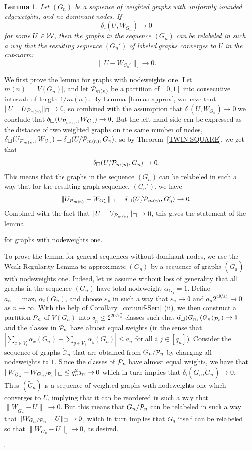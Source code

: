 \documentclass[12pt]{article}
\newtheorem{lemma}[theorem]{Lemma}
\numberwithin{equation}{section}
\newenvironment{proof}{\medskip\noindent{\bf Proof.
}}{\hfill$\square$\medskip}
\def\eps{\varepsilon}
\def\PP{{\cal P}}\def\QQ{{\cal Q}}\def\RR{{\cal R}}
\begin{document}
\begin{lemma}
\label{lem:norm-conv-graph} Let $(G_n)$ be a sequence of weighted
graphs with uniformly bounded edgeweights, {and no dominant nodes}.
If
\[
\delta_\square(U,W_{G_n})\to 0
\]
for some $U\in{\cal W}$, then the graphs in the sequence $(G_n)$  can be
relabeled in such a way that the resulting sequence $(G_n')$ of
labeled graphs converges to $U$ in the cut-norm:
\[
\|U-W_{G_n'}\|_\square\to 0.
\]
\end{lemma}

\begin{proof}
{We first prove the lemma for graphs with nodeweights one.} Let
$m(n)=|V(G_n)|$, and let $\PP_{m(n)}$ be a partition of $[0,1]$ into
consecutive intervals of length $1/m(n)$. By
Lemma~\ref{lem:as-approx}, we have that
$\|U-U_{\PP_{m(n)}}\|_\square\to 0$, so combined with the assumption
that $\delta_\square(U,W_{G_n})\to 0$ we conclude that
$\delta_\square(U_{\PP_{m(n)}},W_{G_n})\to 0$.  But the left hand
side can be expressed as the distance of two weighted graphs on the
same number of nodes,
$\delta_\square(U_{\PP_{m(n)}},W_{G_n})=\delta_\square(U/\PP_{m(n)},G_n)$,
so by Theorem~\ref{TWIN-SQUARE}, we get that
\[
\hat \delta_\square(U/\PP_{m(n)}, G_n)\to 0.
\]
This means that the graphs in the sequence $(G_n)$ can be relabeled
in such a way that for the resulting graph sequence, $(G_n')$, we have
\[
\|U_{\PP_{m(n)}}-W_{G_n'}\|_\square
=d_\square(U/{\PP_{m(n)}},{G_n'})\to 0.
\]
Combined with the fact that
$\|U-U_{\PP_{m(n)}}\|_\square\to 0$,
this gives the statement of the lemma
{for graphs with nodeweights one.

To prove the lemma for general sequences without dominant nodes, we
use the Weak Regularity Lemma to approximate $(G_n)$ by a sequence
of graphs $(\tilde G_n)$ with nodeweights one. Indeed, let us assume
without loss of generality that all graphs in the sequence $(G_n)$
have total nodeweight $\alpha_{G_n}=1$.  Define
$a_n=\max_i\alpha_i(G_n)$, and choose $\eps_n$ in such a way that
$\eps_n\to 0$ and $a_n 2^{40/\eps^2_n}\to 0$ as $n\to\infty$. With
the help of Corollary~\ref{cor:unif-Sem} (ii), we then construct a
partition $\PP_n$ of $V(G_n)$ into $q_n\leq 2^{20/\eps_n^2}$ classes
such that $d_\square(G_n, (G_n)_{\PP_n})\to 0$ and the classes in
$\PP_n$ have almost equal weights (in the sense that $|\sum_{x\in
V_i}\alpha_x(G_n)-\sum_{y\in V_j}\alpha_y(G_n)|\leq a_n$ for all
$i,j\in[q_n]$). {Consider the sequence of graphs $\tilde G_n$ that
are obtained from $G_n/\PP_n$ by changing all nodeweights to $1$.
Since} the classes of $\PP_n$ have almost equal weights, we have
that $\|W_{\tilde G_n}-W_{G_n/\PP_n}\|_\square\leq q_n^2 a_n\to 0$
which in turn implies that $\delta_\square(G_n,\tilde G_n)\to 0$.
{Thus $(\tilde G_n)$ is a sequence of weighted graphs with
nodeweights one which} converges to $U$, implying that it can be
reordered in such a way that $\|W_{\tilde G_n}-U\|_\square\to 0$.
But this means that $G_n/\PP_n$ can be relabeled in such a way that
$\|W_{G_n/\PP_n}-U\|_\square\to 0$, which in turn implies that $G_n$
itself can be {relabeled so} that $\|W_{G_n}-U\|_\square\to 0$, as
desired. }
\end{proof}
\end{document}

